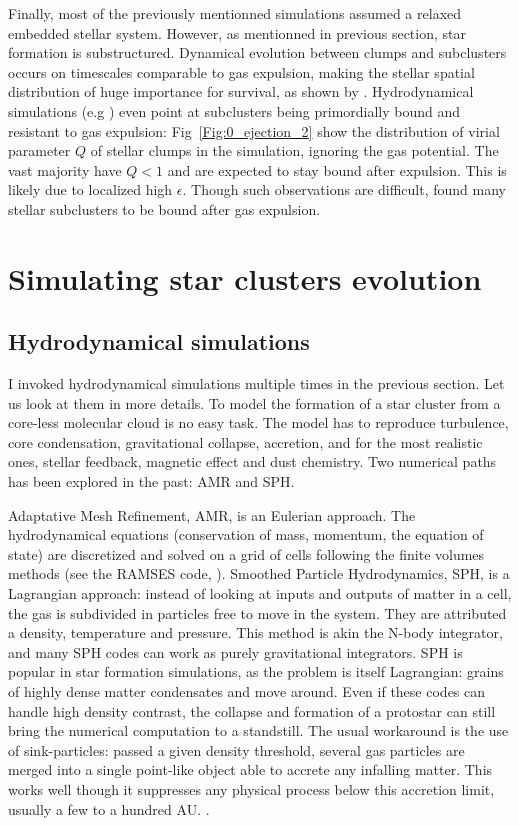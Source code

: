 Finally, most of the previously mentionned simulations assumed a relaxed embedded stellar system. However, as mentionned in previous section, star formation is substructured. Dynamical evolution between clumps and subclusters occurs on timescales comparable to gas expulsion, making the stellar spatial distribution of huge importance for survival, as shown by \cite{Farias2015}. Hydrodynamical simulations (e.g \citealt{Kruijssen2012}) even point at subclusters being primordially bound and resistant to gas expulsion: Fig~\ref{Fig:0_ejection_2} show the distribution of virial parameter $Q$ of stellar clumps in the simulation, ignoring the gas potential. The vast majority have $Q<1$ and are expected to stay bound after expulsion. This is likely due to localized high $\epsilon$. Though such observations are difficult, \cite{Kuhn2015b} found many stellar subclusters to be bound after gas expulsion.


\section{Simulating star clusters evolution}


\subsection{Hydrodynamical simulations}

I invoked hydrodynamical simulations multiple times in the previous section. Let us look at them in more details. To model the formation of a star cluster from a core-less molecular cloud is no easy task. The model has to reproduce turbulence, core condensation, gravitational collapse, accretion, and for the most realistic ones, stellar feedback, magnetic effect and dust chemistry. Two numerical paths has been explored in the past: AMR and SPH.

Adaptative Mesh Refinement, AMR, is an Eulerian approach. The hydrodynamical equations (conservation of mass, momentum, the equation of state) are discretized and solved on a grid of cells following the finite volumes methods (see the RAMSES code, \citealt{Teyssier2002}). Smoothed Particle Hydrodynamics, SPH, is a Lagrangian approach: instead of looking at inputs and outputs of matter in a cell, the gas is subdivided in particles free to move in the system. They are attributed a density, temperature and pressure. This method is akin the N-body integrator, and many SPH codes can work as purely gravitational integrators. SPH is popular in star formation simulations, as the problem is itself Lagrangian: grains of highly dense matter condensates and move around. Even if these codes can handle high density contrast, the collapse and formation of a protostar can still bring the numerical computation to a standstill. The usual workaround is the use of sink-particles: passed a given density threshold, several gas particles are merged into a single point-like object able to accrete any infalling matter. This works well though it suppresses any physical process below this accretion limit, usually a few to a hundred AU. \citep{Bate1997}.

